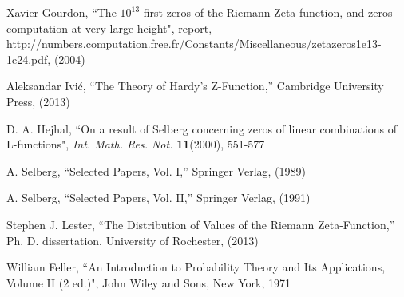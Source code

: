 \documentclass{amsart}
\theoremstyle{definition}
\theoremstyle{remark}
\numberwithin{equation}{section}
\begin{document}
\begin{thebibliography}{10}
 Xavier Gourdon,
``The $10^{13}$ first zeros of the Riemann Zeta function,
and zeros computation at very large height", report,
\url{http://numbers.computation.free.fr/Constants/Miscellaneous/zetazeros1e13-1e24.pdf}, (2004)

 Aleksandar Ivi\'c, ``The Theory of Hardy's Z-Function,''
Cambridge University Press,  (2013)

 D. A. Hejhal,
``On a result of Selberg concerning zeros of linear combinations
of L-functions", 
{\it Int. Math. Res. Not.} {\bf11}(2000), 551-577

 A. Selberg, ``Selected Papers, Vol. I,''
Springer Verlag,  (1989)

 A. Selberg, ``Selected Papers, Vol. II,''
Springer Verlag,  (1991)

 Stephen J. Lester, ``The Distribution of Values of the
Riemann Zeta-Function,''
Ph. D. dissertation, University of Rochester,  (2013)

 William Feller,
``An Introduction to Probability Theory and Its Applications, Volume II (2 ed.)",
John Wiley and Sons, New York, 1971


\end{thebibliography} 
\end{document}
